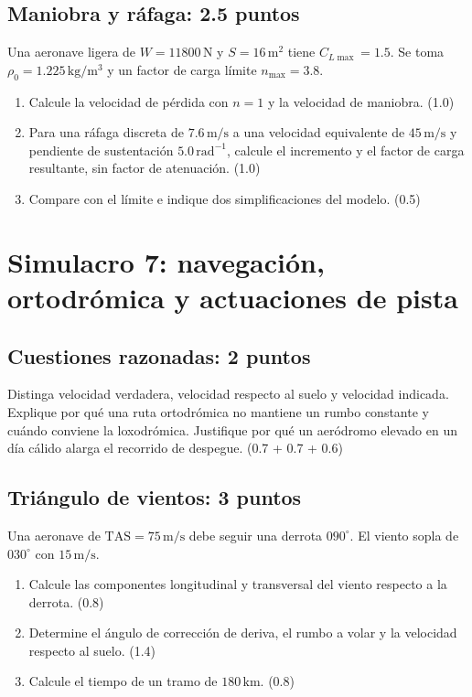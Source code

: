 \section{Maniobra y ráfaga: 2.5 puntos}
Una aeronave ligera de $W=11800\,\mathrm N$ y $S=16\,\mathrm{m^2}$ tiene $C_{L\max}=1.5$. Se toma $\rho_0=1.225\,\mathrm{kg/m^3}$ y un factor de carga límite $n_{\max}=3.8$.
\begin{enumerate}[label=\alph*)]
\item Calcule la velocidad de pérdida con $n=1$ y la velocidad de maniobra. (1.0)
\item Para una ráfaga discreta de $7.6\,\mathrm{m/s}$ a una velocidad equivalente de $45\,\mathrm{m/s}$ y pendiente de sustentación $5.0\,\mathrm{rad^{-1}}$, calcule el incremento y el factor de carga resultante, sin factor de atenuación. (1.0)
\item Compare con el límite e indique dos simplificaciones del modelo. (0.5)
\end{enumerate}

\chapter{Simulacro 7: navegación, ortodrómica y actuaciones de pista}
\section{Cuestiones razonadas: 2 puntos}
Distinga velocidad verdadera, velocidad respecto al suelo y velocidad indicada. Explique por qué una ruta ortodrómica no mantiene un rumbo constante y cuándo conviene la loxodrómica. Justifique por qué un aeródromo elevado en un día cálido alarga el recorrido de despegue. (0.7 + 0.7 + 0.6)
\section{Triángulo de vientos: 3 puntos}
Una aeronave de $\mathrm{TAS}=75\,\mathrm{m/s}$ debe seguir una derrota $090^\circ$. El viento sopla de $030^\circ$ con $15\,\mathrm{m/s}$.
\begin{enumerate}[label=\alph*)]
\item Calcule las componentes longitudinal y transversal del viento respecto a la derrota. (0.8)
\item Determine el ángulo de corrección de deriva, el rumbo a volar y la velocidad respecto al suelo. (1.4)
\item Calcule el tiempo de un tramo de $180\,\mathrm{km}$. (0.8)
\end{enumerate}
